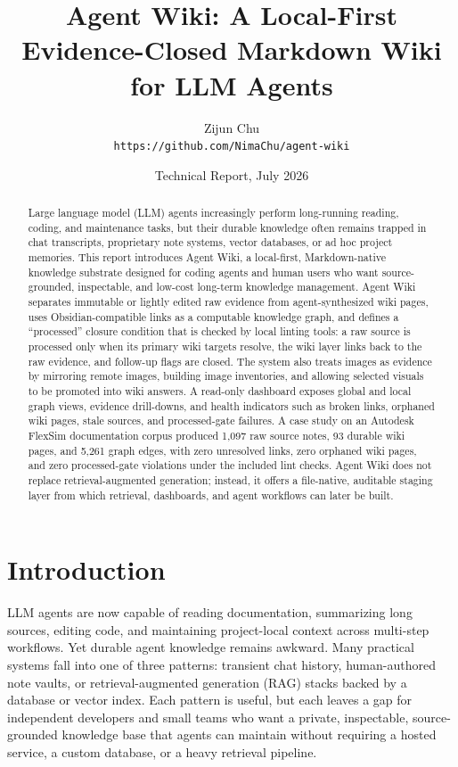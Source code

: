 \documentclass[10pt]{article}
\title{Agent Wiki: A Local-First Evidence-Closed Markdown Wiki for LLM Agents}
\author{Zijun Chu\\
\texttt{https://github.com/NimaChu/agent-wiki}}
\date{Technical Report, July 2026}
\begin{document}
\maketitle

\begin{abstract}
Large language model (LLM) agents increasingly perform long-running reading,
coding, and maintenance tasks, but their durable knowledge often remains trapped
in chat transcripts, proprietary note systems, vector databases, or ad hoc
project memories. This report introduces Agent Wiki, a local-first,
Markdown-native knowledge substrate designed for coding agents and human users
who want source-grounded, inspectable, and low-cost long-term knowledge
management. Agent Wiki separates immutable or lightly edited raw evidence from
agent-synthesized wiki pages, uses Obsidian-compatible links as a computable
knowledge graph, and defines a ``processed'' closure condition that is checked by
local linting tools: a raw source is processed only when its primary wiki targets
resolve, the wiki layer links back to the raw evidence, and follow-up flags are
closed. The system also treats images as evidence by mirroring remote images,
building image inventories, and allowing selected visuals to be promoted into
wiki answers. A read-only dashboard exposes global and local graph views,
evidence drill-downs, and health indicators such as broken links, orphaned wiki
pages, stale sources, and processed-gate failures. A case study on an Autodesk
FlexSim documentation corpus produced 1,097 raw source notes, 93 durable wiki
pages, and 5,261 graph edges, with zero unresolved links, zero orphaned wiki
pages, and zero processed-gate violations under the included lint checks. Agent
Wiki does not replace retrieval-augmented generation; instead, it offers a
file-native, auditable staging layer from which retrieval, dashboards, and agent
workflows can later be built.
\end{abstract}

\section{Introduction}

LLM agents are now capable of reading documentation, summarizing long sources,
editing code, and maintaining project-local context across multi-step workflows.
Yet durable agent knowledge remains awkward. Many practical systems fall into
one of three patterns: transient chat history, human-authored note vaults, or
retrieval-augmented generation (RAG) stacks backed by a database or vector
index. Each pattern is useful, but each leaves a gap for independent developers
and small teams who want a private, inspectable, source-grounded knowledge base
that agents can maintain without requiring a hosted service, a custom database,
or a heavy retrieval pipeline.
\end{document}

